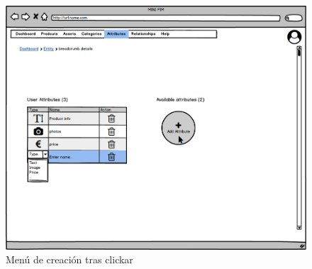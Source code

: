 \begin{figure}[H]
    \includegraphics[width=1\linewidth]{mockups/RF6.1Crear_Atributo tras Clickar.png}
    \caption{Menú de creación tras clickar}
   \end{figure}
\vspace{1.0cm}

\newpage %